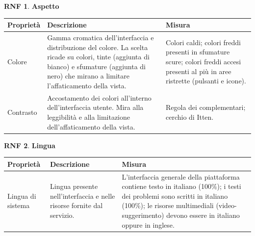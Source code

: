 \documentclass[11pt, a4paper]{article}
\theoremstyle{definition}
\newtheorem{nonfuncreq}{RNF} %
\begin{document}
\newpage
\begin{nonfuncreq}
    \textbf{Aspetto }
    \begin{center}
        \footnotesize
        \begin{tabularx}{\textwidth}{|X||X||X|}
            \hline
            \cellcolor{red!70}Proprietà & \cellcolor{red!70}Descrizione & \cellcolor{red!70}Misura\\
            \hline
            Colore & Gamma cromatica dell'interfaccia e distribuzione del colore. La scelta ricade su colori, tinte (aggiunta di bianco) e sfumature (aggiunta di nero) che mirano a limitare l'affaticamento della vista. & Colori caldi; colori freddi presenti in sfumature scure; colori freddi accesi presenti al più in aree ristrette (pulsanti e icone).\\
            \hline
            Contrasto & Accostamento dei colori all'interno dell'interfaccia utente. Mira alla leggibilità e alla limitazione dell'affaticamento della vista. & Regola dei complementari; cerchio di Itten.\\
            \hline
        \end{tabularx}
    \end{center}
\end{nonfuncreq}

\begin{nonfuncreq}
    \textbf{Lingua }
    \begin{center}
        \footnotesize
        \begin{tabularx}{\textwidth}{|X||X||X|}
            \hline
            \cellcolor{red!70}Proprietà & \cellcolor{red!70}Descrizione & \cellcolor{red!70}Misura\\
            \hline
            Lingua di sistema           & Lingua presente nell'interfaccia e nelle risorse fornite dal servizio. & L'interfaccia generale della piattaforma contiene testo in italiano (100\%); i testi dei problemi sono scritti in italiano (100\%); le risorse multimediali (video-suggerimento) devono essere in italiano oppure in inglese.\\
            \hline
        \end{tabularx}
    \end{center}
\end{nonfuncreq}
\end{document}
